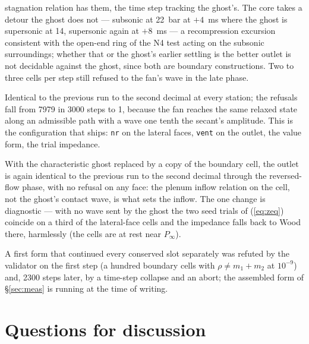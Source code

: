 \documentclass[11pt,a4paper]{article}
\newcommand{\code}[1]{\texttt{\small #1}}
\newcommand{\Pinf}{P_\infty}
\begin{document}
\begin{description}
stagnation relation has them, the time step tracking the ghost's.  The
core takes a detour the ghost does not --- subsonic at 22~bar at
$+4$~ms where the ghost is supersonic at 14, supersonic again at
$+8$~ms --- a recompression excursion consistent with the open-end ring
of the N4 test acting on the subsonic surroundings; whether that or the
ghost's earlier settling is the better outlet is not decidable against
the ghost, since both are boundary constructions.  Two to three cells
per step still refused to the fan's wave in the late phase.
\item[\code{vent} with the fan as the outflow wave model.]  Identical to
the previous run to the second decimal at every station; the refusals
fall from 7979 in 3000 steps to 1, because the fan reaches the same
relaxed state along an admissible path with a wave one tenth the
secant's amplitude.  This is the configuration that ships: \code{nr}
on the lateral faces, \code{vent} on the outlet, the value form, the
trial impedance.
\item[Ghost fill: copy.]  With the characteristic ghost replaced by a
copy of the boundary cell, the outlet is again identical to the
previous run to the second decimal through the reversed-flow phase,
with no refusal on any face: the plenum inflow relation on the cell,
not the ghost's contact wave, is what sets the inflow.  The one change
is diagnostic --- with no wave sent by the ghost the two seed trials of
(\ref{eq:zeq}) coincide on a third of the lateral-face cells and the
impedance falls back to Wood there, harmlessly (the cells are at rest
near $\Pinf$).
\item[Ghost fill: continuation.]  A first form that continued every
conserved slot separately was refuted by the validator on the first
step (a hundred boundary cells with $\rho \ne m_1 + m_2$ at $10^{-9}$)
and, 2300 steps later, by a time-step collapse and an abort; the
assembled form of \S\ref{sec:meas} is running at the time of writing.
\end{description}

\section{Questions for discussion}
\end{document}
